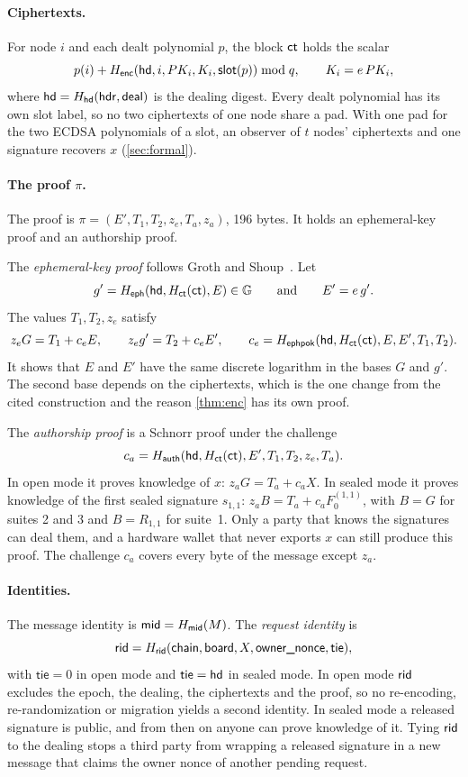 \paragraph{Ciphertexts.} For node $i$ and each dealt polynomial $p$, the block $\mathsf{ct}$ holds the scalar
\[
  p(i) + H_{\mathsf{enc}}(\mathsf{hd}, i, PK_i, K_i, \mathsf{slot}(p)) \bmod q, \qquad K_i = e\,PK_i ,
\]
where $\mathsf{hd} = H_{\mathsf{hd}}(\mathsf{hdr}, \mathsf{deal})$ is the dealing digest. Every dealt polynomial has its own slot label, so no two ciphertexts of one node share a pad. With one pad for the two ECDSA polynomials of a slot, an observer of $t$ nodes' ciphertexts and one signature recovers $x$ (\cref{sec:formal}).

\paragraph{The proof $\pi$.} The proof is $\pi = (E', T_1, T_2, z_e, T_a, z_a)$, 196 bytes. It holds an ephemeral-key proof and an authorship proof.

The \emph{ephemeral-key proof} follows Groth and Shoup~\cite[Section~4.1]{GS22}. Let
\[
  g' = H_{\mathsf{eph}}(\mathsf{hd}, H_{\mathsf{ct}}(\mathsf{ct}), E) \in \mathbb{G} \qquad\text{and}\qquad E' = e\,g' .
\]
The values $T_1, T_2, z_e$ satisfy
\[
  z_e G = T_1 + c_e E, \qquad z_e g' = T_2 + c_e E', \qquad c_e = H_{\mathsf{ephpok}}(\mathsf{hd}, H_{\mathsf{ct}}(\mathsf{ct}), E, E', T_1, T_2).
\]
It shows that $E$ and $E'$ have the same discrete logarithm in the bases $G$ and $g'$. The second base depends on the ciphertexts, which is the one change from the cited construction and the reason \cref{thm:enc} has its own proof.

The \emph{authorship proof} is a Schnorr proof under the challenge
\[
  c_a = H_{\mathsf{auth}}(\mathsf{hd}, H_{\mathsf{ct}}(\mathsf{ct}), E', T_1, T_2, z_e, T_a).
\]
In open mode it proves knowledge of $x$: $z_a G = T_a + c_a X$. In sealed mode it proves knowledge of the first sealed signature $s_{1,1}$: $z_a B = T_a + c_a F_0^{(1,1)}$, with $B = G$ for suites 2 and 3 and $B = R_{1,1}$ for suite~1. Only a party that knows the signatures can deal them, and a hardware wallet that never exports $x$ can still produce this proof. The challenge $c_a$ covers every byte of the message except $z_a$.

\paragraph{Identities.} The message identity is $\mathsf{mid} = H_{\mathsf{mid}}(M)$. The \emph{request identity} is
\[
  \mathsf{rid} = H_{\mathsf{rid}}(\textsf{chain}, \textsf{board}, X, \textsf{owner\_nonce}, \mathsf{tie}),
\]
with $\mathsf{tie} = 0$ in open mode and $\mathsf{tie} = \mathsf{hd}$ in sealed mode. In open mode $\mathsf{rid}$ excludes the epoch, the dealing, the ciphertexts and the proof, so no re-encoding, re-randomization or migration yields a second identity. In sealed mode a released signature is public, and from then on anyone can prove knowledge of it. Tying $\mathsf{rid}$ to the dealing stops a third party from wrapping a released signature in a new message that claims the owner nonce of another pending request.

